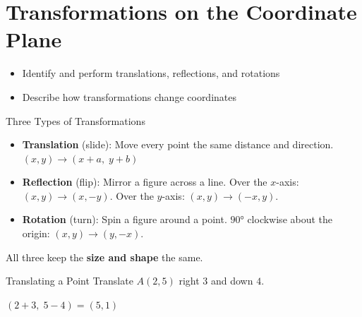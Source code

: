 \section{Transformations on the Coordinate Plane}

\begin{learningGoals}
\begin{itemize}
    \item Identify and perform translations, reflections, and rotations
    \item Describe how transformations change coordinates
\end{itemize}
\end{learningGoals}

\begin{conceptBox}{Three Types of Transformations}
\begin{itemize}[leftmargin=*]
    \item \textbf{Translation} (slide): Move every point the same distance and direction.
    $(x, y) \to (x + a,\; y + b)$
    \item \textbf{Reflection} (flip): Mirror a figure across a line.
    Over the $x$-axis: $(x, y) \to (x, -y)$.
    Over the $y$-axis: $(x, y) \to (-x, y)$.
    \item \textbf{Rotation} (turn): Spin a figure around a point.
    $90°$ clockwise about the origin: $(x, y) \to (y, -x)$.
\end{itemize}
All three keep the \textbf{size and shape} the same.
\end{conceptBox}

\begin{workedExample}{Translating a Point}
Translate $A(2, 5)$ right $3$ and down $4$.

$(2 + 3,\; 5 - 4) = (5, 1)$
\end{workedExample}


